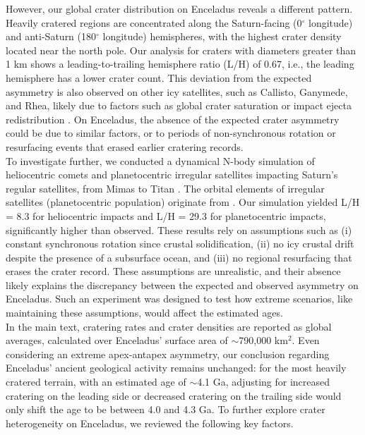 \documentclass[preprint,11pt,3p,times,authoryear]{elsarticle}
\begin{document}
{However, our global crater distribution on Enceladus reveals a different pattern. Heavily cratered regions are concentrated along the Saturn-facing (0$^\circ$ longitude) and anti-Saturn (180$^\circ$ longitude) hemispheres, with the highest crater density located near the north pole. Our analysis for craters with diameters greater than 1 km shows a leading-to-trailing hemisphere ratio (L/H) of 0.67, i.e., the leading hemisphere has a lower crater count. This deviation from the expected asymmetry is also observed on other icy satellites, such as Callisto, Ganymede, and Rhea, likely due to factors such as global crater saturation or impact ejecta redistribution \citep{Zahnle2003,Xu2017,Schenk2020}. On Enceladus, the absence of the expected crater asymmetry could be due to similar factors, or to periods of non-synchronous rotation or resurfacing events that erased earlier cratering records.\\

To investigate further, we conducted a dynamical N-body simulation of heliocentric comets and planetocentric irregular satellites impacting Saturn's regular satellites, from Mimas to Titan \citep{Wong2021}. The  orbital elements of irregular satellites (planetocentric population) originate from \citet{Nesvorny2007}. Our simulation yielded L/H = 8.3 for heliocentric impacts and L/H = 29.3 for planetocentric impacts, significantly higher than observed. These results rely on assumptions such as (i) constant synchronous rotation since crustal solidification, (ii) no icy crustal drift despite the presence of a subsurface ocean, and (iii) no regional resurfacing that erases the crater record. These assumptions are unrealistic, and their absence likely explains the discrepancy between the expected and observed asymmetry on Enceladus. Such an experiment was designed to test how extreme scenarios, like maintaining these assumptions, would affect the estimated ages.\\

In the main text, cratering rates and crater densities are reported as global averages, calculated over Enceladus' surface area of $\sim$790,000 km$^2$. Even considering an extreme apex-antapex asymmetry, our conclusion regarding Enceladus' ancient geological activity remains unchanged: for the most heavily cratered terrain, with an estimated age of $\sim$4.1 Ga, adjusting for increased cratering on the leading side or decreased cratering on the trailing side would only shift the age to be between 4.0 and 4.3 Ga. To further explore crater heterogeneity on Enceladus, we reviewed the following key factors.\\

}
\end{document}
